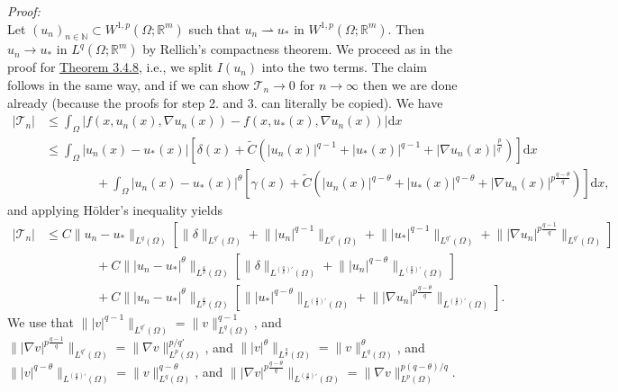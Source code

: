 \textit{Proof:}\\
Let $(u_n)_{n\in\mathbb{N}}\subset W^{1,p}(\Omega;\mathbb{R}^m)$ such that $u_n\rightharpoonup u_*$ in $W^{1,p}(\Omega;\mathbb{R}^m)$. Then $u_n\to u_*$ in $L^q(\Omega;\mathbb{R}^m)$ by Rellich's compactness theorem. We proceed as in the proof for \hyperlink{theorem_3_4_8}{Theorem 3.4.8}, i.e., we split $I(u_n)$ into the two terms. The claim follows in the same way, and if we can show $\mathcal{T}_n\to0$ for $n\to\infty$ then we are done already (because the proofs for step 2. and 3. can literally be copied). We have
\begin{align*}
	\lvert\mathcal{T}_n\rvert&\leq\int_\Omega{\lvert f(x,u_n(x),\nabla u_n(x))-f(x,u_*(x),\nabla u_n(x))\rvert\mathrm{d}x}\\
	&\leq\int_\Omega{\lvert u_n(x)-u_*(x)\rvert\left[\delta(x)+\widetilde{C}\left(\lvert u_n(x)\rvert^{q-1}+\lvert u_*(x)\rvert^{q-1}+\lvert\nabla u_n(x)\rvert^{\frac{p}{q'}}\right)\right]\mathrm{d}x}\\
	&\qquad\qquad+\int_\Omega{\lvert u_n(x)-u_*(x)\rvert^\theta\left[\gamma(x)+\widetilde{C}\left(\lvert u_n(x)\rvert^{q-\theta}+\lvert u_*(x)\rvert^{q-\theta}+\lvert\nabla u_n(x)\rvert^{p\frac{q-\theta}{q}}\right)\right]\mathrm{d}x},
\end{align*}
and applying H\"older's inequality yields
\begin{align*}
	\lvert\mathcal{T}_n\rvert&\leq C\lVert u_n-u_*\rVert_{L^q(\Omega)}\left[\lVert\delta\rVert_{L^{q'}(\Omega)}+\big\lVert\lvert u_n\rvert^{q-1}\big\rVert_{L^{q'}(\Omega)}+\big\lVert\lvert u_*\rvert^{q-1}\big\rVert_{L^{q'}(\Omega)}+\big\lVert\lvert\nabla u_n\rvert^{p\frac{q-1}{q}}\big\rVert_{L^{q'}(\Omega)}\right]\\
	&\qquad\qquad+C\big\lVert\lvert u_n-u_*\rvert^\theta\big\rVert_{L^{\frac{q}{\theta}}(\Omega)}\left[\lVert\delta\rVert_{L^{(\frac{q}{\theta})'}(\Omega)}+\big\lVert\lvert u_n\rvert^{q-\theta}\big\rVert_{L^{(\frac{q}{\theta})'}(\Omega)}\right]\\
	&\qquad\qquad+C\big\lVert\lvert u_n-u_*\rvert^\theta\big\rVert_{L^{\frac{q}{\theta}}(\Omega)}\left[\big\lVert\lvert u_*\rvert^{q-\theta}\big\rVert_{L^{(\frac{q}{\theta})'}(\Omega)}+\big\lVert\lvert\nabla u_n\rvert^{p\frac{q-\theta}{q}}\big\rVert_{L^{(\frac{q}{\theta})'}(\Omega)}\right].
\end{align*}
We use that $\big\lVert\lvert v\rvert^{q-1}\big\rVert_{L^{q'}(\Omega)}=\lVert v\rVert_{L^q(\Omega)}^{q-1}$, and $\big\lVert\lvert\nabla v\rvert^{p\frac{q-1}{q}}\big\rVert_{L^{q'}(\Omega)}=\lVert\nabla v\rVert_{L^p(\Omega)}^{p/q'}$, and $\big\lVert\lvert v\rvert^\theta\big\rVert_{L^{\frac{q}{\theta}}(\Omega)}=\lVert v\rVert_{L^q(\Omega)}^\theta$, and $\big\lVert\lvert v\rvert^{q-\theta}\big\rVert_{L^{(\frac{q}{\theta})'}(\Omega)}=\lVert v\rVert_{L^q(\Omega)}^{q-\theta}$, and $\big\lVert\lvert \nabla v\rvert^{p\frac{q-\theta}{q}}\big\rVert_{L^{(\frac{q}{\theta})'}(\Omega)}=\lVert\nabla v\rVert_{L^p(\Omega)}^{p(q-\theta)/q}$.\\

